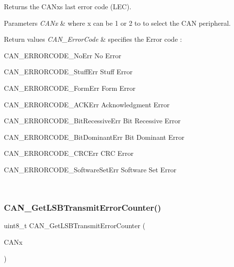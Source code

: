 Returns the C\+A\+Nx\textquotesingle{}s last error code (L\+EC). 


\begin{DoxyParams}{Parameters}
{\em C\+A\+Nx} & where x can be 1 or 2 to to select the C\+AN peripheral.\\
\hline
\end{DoxyParams}

\begin{DoxyRetVals}{Return values}
{\em C\+A\+N\+\_\+\+Error\+Code} & specifies the Error code \+:
\begin{DoxyItemize}
\item C\+A\+N\+\_\+\+E\+R\+R\+O\+R\+C\+O\+D\+E\+\_\+\+No\+Err No Error
\item C\+A\+N\+\_\+\+E\+R\+R\+O\+R\+C\+O\+D\+E\+\_\+\+Stuff\+Err Stuff Error
\item C\+A\+N\+\_\+\+E\+R\+R\+O\+R\+C\+O\+D\+E\+\_\+\+Form\+Err Form Error
\item C\+A\+N\+\_\+\+E\+R\+R\+O\+R\+C\+O\+D\+E\+\_\+\+A\+C\+K\+Err Acknowledgment Error
\item C\+A\+N\+\_\+\+E\+R\+R\+O\+R\+C\+O\+D\+E\+\_\+\+Bit\+Recessive\+Err Bit Recessive Error
\item C\+A\+N\+\_\+\+E\+R\+R\+O\+R\+C\+O\+D\+E\+\_\+\+Bit\+Dominant\+Err Bit Dominant Error
\item C\+A\+N\+\_\+\+E\+R\+R\+O\+R\+C\+O\+D\+E\+\_\+\+C\+R\+C\+Err C\+RC Error
\item C\+A\+N\+\_\+\+E\+R\+R\+O\+R\+C\+O\+D\+E\+\_\+\+Software\+Set\+Err Software Set Error 
\end{DoxyItemize}\\
\hline
\end{DoxyRetVals}
\mbox{\label{group___c_a_n___private___functions_ga85ee0c35bf7ca15d4e4c862eef534843}} 
\subsubsection{\texorpdfstring{CAN\_GetLSBTransmitErrorCounter()}{CAN\_GetLSBTransmitErrorCounter()}}
{\footnotesize\ttfamily uint8\+\_\+t C\+A\+N\+\_\+\+Get\+L\+S\+B\+Transmit\+Error\+Counter (\begin{DoxyParamCaption}\item[{\mbox{\hyperlink{struct_c_a_n___type_def}{C\+A\+N\+\_\+\+Type\+Def}} $\ast$}]{C\+A\+Nx }\end{DoxyParamCaption})}




